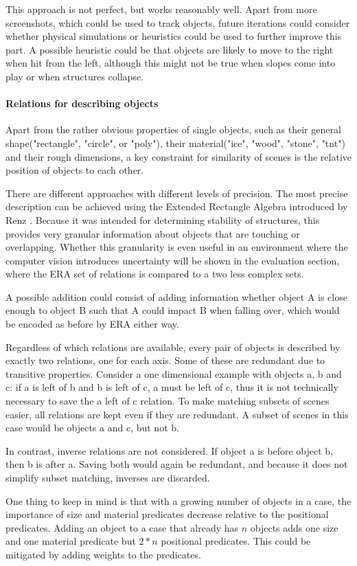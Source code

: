This approach is not perfect, but works reasonably well. Apart from more screenshots, which could be used to track objects, future iterations could consider whether physical simulations or heuristics could be used to further improve this part. A possible heuristic could be that objects are likely to move to the right when hit from the left, although this might not be true when slopes come into play or when structures collapse.


\paragraph{Relations for describing objects}
Apart from the rather obvious properties of single objects, such as their general shape("rectangle", "circle", or "poly"), their material("ice", "wood", "stone", "tnt") and their rough dimensions, a key constraint for similarity of scenes is the relative position of objects to each other.

There are different approaches with different levels of precision.
The most precise description can be achieved using the Extended Rectangle Algebra introduced by Renz \cite{Renz-ERA}. Because it was intended for determining stability of structures, this provides very granular information about objects that are touching or overlapping.
Whether this granularity is even useful in an environment where the computer vision introduces uncertainty will be shown in the evaluation section, where the ERA set of relations is compared to a two less complex sets.

A possible addition could consist of adding information whether object A is close enough to object B such that A could impact B when falling over, which would be encoded as before by ERA either way.


Regardless of which relations are available, every pair of objects is described by exactly two relations, one for each axis. Some of these are redundant due to transitive properties.
Consider a one dimensional example with objects a, b and c: if a is left of b and b is left of c, a must be left of c, thus it is not technically necessary to save the a left of c relation.
To make matching subsets of scenes easier, all relations are kept even if they are redundant. A subset of scenes in this case would be objects a and c, but not b.

In contrast, inverse relations are not considered. If object a is before object b, then b is after a. Saving both would again be redundant, and because it does not simplify subset matching, inverses are discarded.

One thing to keep in mind is that with a growing number of objects in a case, the importance of size and material predicates decrease relative to the positional predicates. Adding an object to a case that already has $n$ objects adds one size and one material predicate but $2*n$ positional predicates. This could be mitigated by adding weights to the predicates.

